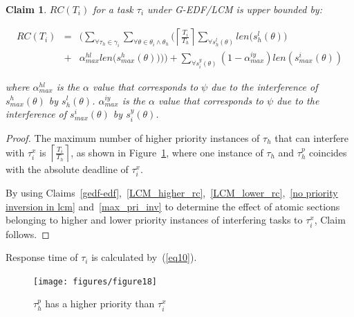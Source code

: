 \documentclass[12pt,english]{report}
\newtheorem{clm}{Claim}
\newtheorem{proof}{Proof}
\begin{document}
\begin{clm}\label{GEDF/LCM response time}
$RC(T_i)$ for a task $\tau_i$ under G-EDF/LCM is upper bounded by:

\begin{eqnarray}
RC(T_i) & = & \Bigg(\sum_{\forall \tau_h \in \gamma_i}\sum_{\forall\theta \in \theta_i \wedge \theta_h}\Bigg(\left\lceil\frac{T_{i}}{T_{h}}\right\rceil\sum_{\forall s_{h}^{l}(\theta)}len\Big(s_{h}^{l}(\theta)\Big)\nonumber\\
& + & \alpha_{max}^{hl}len\Big(s_{max}^{h}(\theta)\Big)\Bigg)\Bigg) + \sum_{\forall s_{i}^{y}(\theta)}\left(1-\alpha_{max}^{iy}\right)len\left(s_{max}^i(\theta)\right)  
\label{eq78}\end{eqnarray}

where $\alpha_{max}^{hl}$ is the $\alpha$ value that corresponds to $\psi$ due to the interference of $s_{max}^h(\theta)$ by $s_h^l(\theta)$. $\alpha_{max}^{iy}$ is the $\alpha$ value that corresponds to $\psi$ due to the interference of $s_{max}^i(\theta)$ by $s_i^y(\theta)$.
\end{clm}

\begin{proof}\normalfont
The maximum number of higher priority instances of $\tau_h$ that can interfere with $\tau_i^x$ is $\left\lceil\frac{T_i}{T_h}\right\rceil$, as shown in Figure~\ref{fig17}, where one instance of $\tau_h$ and $\tau_h^p$ coincides with the absolute deadline of $\tau_i^x$.

By using Claims~\ref{gedf-edf},~\ref{LCM_higher_rc},~\ref{LCM_lower_rc},~\ref{no priority inversion in lcm} and~\ref{max_pri_inv} to determine the effect of atomic sections belonging to higher and lower priority instances of interfering tasks to $\tau_i^x$, Claim follows.
\end{proof}


Response time of $\tau_{i}$ is calculated by~(\ref{eq10}).
\begin{figure}
\begin{centering}
\texttt{[image: figures/figure18]}
\par\end{centering}
\caption{\label{fig17}$\tau_h^p$ has a higher priority than $\tau_i^x$}
\end{figure}
\end{document}
